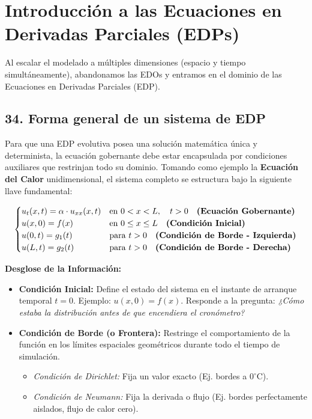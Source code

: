 \documentclass[12pt]{article}
\begin{document}
\section*{Introducción a las Ecuaciones en Derivadas Parciales (EDPs)}


\vspace{0.3cm}

Al escalar el modelado a múltiples dimensiones (espacio y tiempo simultáneamente), abandonamos las EDOs y entramos en el dominio de las Ecuaciones en Derivadas Parciales (EDP). 

\subsection*{34. Forma general de un sistema de EDP}
Para que una EDP evolutiva posea una solución matemática única y determinista, la ecuación gobernante debe estar encapsulada por condiciones auxiliares que restrinjan todo su dominio. Tomando como ejemplo la \textbf{Ecuación del Calor} unidimensional, el sistema completo se estructura bajo la siguiente llave fundamental:

\begin{equation}
\begin{cases}
    u_t(x,t) = \alpha \cdot u_{xx}(x,t) & \text{en } 0 < x < L, \quad t > 0 \quad \text{\textbf{(Ecuación Gobernante)}} \\
    u(x,0) = f(x) & \text{en } 0 \le x \le L \quad \text{\textbf{(Condición Inicial)}} \\
    u(0,t) = g_1(t) & \text{para } t > 0 \quad \text{\textbf{(Condición de Borde - Izquierda)}} \\
    u(L,t) = g_2(t) & \text{para } t > 0 \quad \text{\textbf{(Condición de Borde - Derecha)}}
\end{cases}
\end{equation}

\textbf{Desglose de la Información:}

\begin{itemize}
    \item \textbf{Condición Inicial:} Define el estado del sistema en el instante de arranque temporal $t = 0$. Ejemplo: $u(x, 0) = f(x)$. Responde a la pregunta: \textit{¿Cómo estaba la distribución antes de que encendiera el cronómetro?}
    \item \textbf{Condición de Borde (o Frontera):} Restringe el comportamiento de la función en los límites espaciales geométricos durante todo el tiempo de simulación. 
    \begin{itemize}
        \item \textit{Condición de Dirichlet:} Fija un valor exacto (Ej. bordes a $0^\circ$C).
        \item \textit{Condición de Neumann:} Fija la derivada o flujo (Ej. bordes perfectamente aislados, flujo de calor cero).
    \end{itemize}
\end{itemize}
\end{document}
